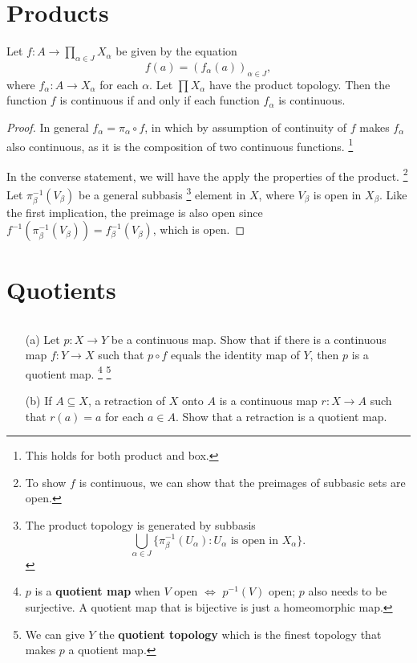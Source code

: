 \documentclass[../main.tex]{subfiles}
\begin{document}
\section{Products}

\begin{problem}[Theorem 19.6]
    Let $f : A \to \prod_{\alpha \in J} X_\alpha$ be given by the equation
    \begin{equation}
        f(a) = (f_\alpha(a))_{\alpha \in J},
    \end{equation}
    where $f_\alpha : A \to X_\alpha$ for each $\alpha$.
    Let $\prod X_\alpha$ have the product topology.
    Then the function $f$ is continuous if and only if each function $f_\alpha$ is continuous.
\end{problem}

\begin{proof}
    In general $f_\alpha = \pi_\alpha \circ f$, in which by assumption of continuity of $f$ makes $f_\alpha$ also continuous, as it is the composition of two continuous functions.
    \footnote{This holds for both product and box.}

    In the converse statement, we will have the apply the properties of the product.
    \footnote{To show $f$ is continuous, we can show that the preimages of subbasic sets are open.}
    Let $\pi_\beta^{-1}(V_\beta)$ be a general subbasis
    \footnote{The product topology is generated by subbasis
        \begin{equation*}
            \bigcup_{\alpha \in J} \{ \pi_\beta^{-1}(U_\alpha) : U_\alpha \text{ is open in } X_\alpha \}.
        \end{equation*}
    }
    element in $X$,
    where $V_\beta$ is open in $X_\beta$.
    Like the first implication, the preimage is also open since
    $f^{-1}(\pi_\beta^{-1}(V_\beta)) = f_\beta^{-1}(V_\beta)$, which is open.
\end{proof}

\section{Quotients}

\begin{problem}[\S22 Ex. 2]
$ $
\begin{itemize}
    \item[(a)]
        Let $p: X \to Y$ be a continuous map.
        Show that if there is a continuous map $f : Y \to X$ such that $p \circ f$ equals the identity map of $Y$, then $p$ is a quotient map.
        \footnote{$p$ is a \textbf{quotient map} when $V$ open $\Leftrightarrow$ $p^{-1}(V)$ open; $p$ also needs to be surjective.
        A quotient map that is bijective is just a homeomorphic map.}
        \footnote{We can give $Y$ the \textbf{quotient topology} which is the finest topology that makes $p$ a quotient map.}

    \item[(b)]
        If $A \subseteq X$, a retraction of $X$ onto $A$ is a continuous map $r : X \to A$ such that $r(a) = a$ for each $a \in A$.
        Show that a retraction is a quotient map.
\end{itemize}
\end{problem}
\end{document}
